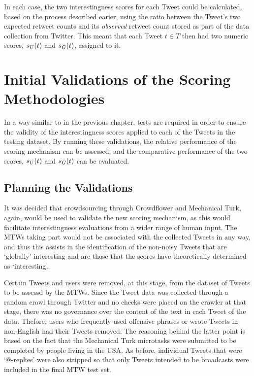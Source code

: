 In each case, the two interestingness scores for each Tweet could be calculated, based on the process described earier, using the ratio between the Tweet's two expected retweet counts and its \textit{observed} retweet count stored as part of the data collection from Twitter. This meant that each Tweet $t \in T$ then had two numeric scores, $s_U(t)$ and $s_G(t)$, assigned to it. 



\section{Initial Validations of the Scoring Methodologies}
In a way similar to in the previous chapter, tests are required in order to ensure the validity of the interestingness scores applied to each of the Tweets in the testing dataset. By running these validations, the relative performance of the scoring mechanism can be assessed, and the comparative performance of the two scores, $s_U(t)$ and $s_G(t)$ can be evaluated.


\subsection{Planning the Validations}
It was decided that crowdsourcing through Crowdflower and Mechanical Turk, again, would be used to validate the new scoring mechanism, as this would facilitate interestingness evaluations from a wider range of human input. The MTWs taking part would not be associated with the collected Tweets in any way, and thus this assists in the identification of the non-noisy Tweets that are `globally' interesting and are those that the scores have theoretically determined as `interesting'.

Certain Tweets and users were removed, at this stage, from the dataset of Tweets to be assessd by the MTWs. Since the Tweet data was collected through a random crawl through Twitter and no checks were placed on the crawler at that stage, there was no governance over the content of the text in each Tweet of the data. Thefore, users who frequently used offensive phrases or wrote Tweets in non-English had their Tweets removed. The reasoning behind the latter point is based on the fact that the Mechanical Turk microtasks were submitted to be completed by people living in the USA. As before, individual Tweets that were `@-replies' were also stripped so that only Tweets intended to be broadcasts were included in the final MTW test set.


